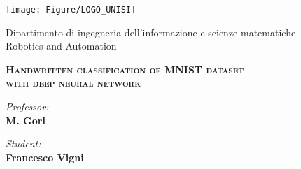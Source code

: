 \thispagestyle{empty}
\begin{center}
\texttt{[image: Figure/LOGO\_UNISI]}

\large{ \sc Dipartimento di ingegneria dell'informazione e scienze matematiche}
\vspace{0.5cm
\large Computer and Automation Engineering}\\
\vspace{0.5cm}
\large {\sc Robotics and Automation}
\vspace{1cm}
 

\textbf{\scshape{\LARGE{Handwritten classification of MNIST dataset\\with deep neural network\\}}}
\end{center}

\noindent\begin{minipage}[b]{0.47\textwidth}
\large
\emph{Professor:}\\
\textbf{M. Gori}  
\end{minipage}
\hfill
\begin{minipage}[b]{0.47\textwidth}\raggedleft
 \large
\emph{Student:}\\
\textbf{Francesco Vigni}\\


\end{minipage}

%
%


